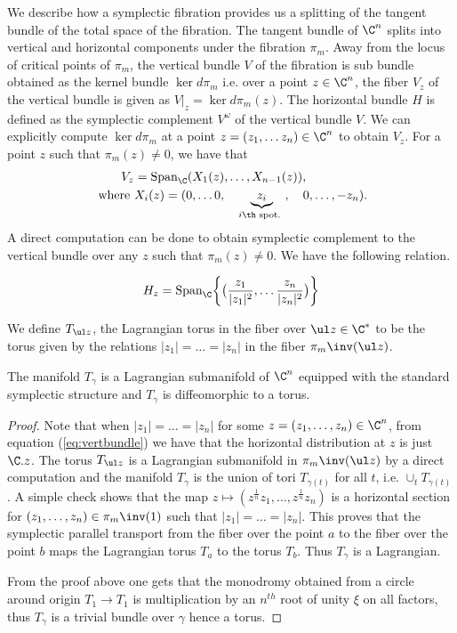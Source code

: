 We describe how a symplectic fibration provides us a splitting of the tangent bundle of the total space of the fibration. The tangent bundle of $\C^n$ splits into vertical and horizontal components under the fibration $\pi_m$. Away from the locus of critical points of $\pi_m$, the vertical bundle $V$ of the fibration is sub bundle obtained as the kernel bundle $\ker d\pi_m$ i.e. over a point $z\in \C^n$, the fiber $V_z$ of the vertical bundle is given as $V|_z = \ker d\pi_m(z)$. The horizontal bundle $H$ is defined as the symplectic complement $V^\omega$ of the vertical bundle $V$.  We can explicitly compute $\ker d\pi_m$ at a point $z =(z_1,\dots z_n) \in \C ^n$ to obtain $V_z$. For a point $z$ such that $\pi_m(z)\neq 0$, we have that
\begin{align*}
V_z &= \text{Span}_\C(X_1(z),\dots, X_{n-1}(z)),    \\
\text{ where }& X_i(z) = (0, \dots 0, \quad \underbrace{ z_i}_{i\th \text{ spot. }} ,\quad 0, \dots ,-z_n ).
\end{align*}
A direct computation can be done to obtain symplectic complement to the vertical bundle over any $z$ such that $\pi_m(z)\neq 0$. We have the following relation.

\begin{equation}\label{eq:vertbundle}
    H_z = \text{Span}_\C \bigg \{ \big (\frac{z_1}{|z_1|^2}, \dots \frac{z_n}{|z_n|^2}\big ) \bigg\}
\end{equation}


\begin{defn}
We define $T_{\ul z }$, the Lagrangian torus in the fiber over $\ul z\in \C^*$ to be the torus given by the relations $|z_1|=\dots=|z_n|$ in the fiber $\pi_m\inv (\ul z)$.
\end{defn}

\begin{lemma}
The manifold $T_\gamma$ is a Lagrangian submanifold of $\C^n$ equipped with the standard symplectic structure and $T_\gamma$ is diffeomorphic to a torus.  
\end{lemma}

\begin{proof}
Note that when $|z_1|=\dots=|z_n|$ for some $z=(z_1,\dots,z_n) \in \C^n$, from equation (\ref{eq:vertbundle}) we have that the horizontal distribution at $z$ is just $\C .z$. The torus $T_{\ul z}$ is a Lagrangian submanifold in $\pi_m\inv (\ul z) $ by a direct computation and the manifold $T_\gamma$ is the union of tori $T_{\gamma(t)}$ for all $t$, i.e. $ \cup_t T_{\gamma(t)}$. A simple check shows that the map $z\mapsto (z^{\frac{1}{n}} z_1, \dots ,z^{\frac{1}{n}} z_n )$ is a horizontal section for $(z_1,\dots,z_n) \in \pi_m \inv (1)$ such that $|z_1|=\dots=|z_n|$. This proves that the symplectic parallel transport from the fiber over the point $a$ to the fiber over the point $ b$ maps the Lagrangian torus $T_a$ to the torus $T_b$. Thus $T_\gamma$ is a Lagrangian.

From the proof above one gets that the monodromy obtained from a circle around origin $T_1 \to T_1$ is multiplication by an $n^{th}$ root of unity $\xi$ on all factors, thus $T_\gamma$ is a trivial bundle over $\gamma$ hence a torus.
\end{proof}


